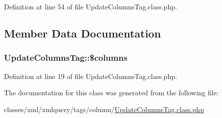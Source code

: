 Definition at line 54 of file Update\-Columns\-Tag.\-class.\-php.



\subsection{Member Data Documentation}
\hypertarget{classUpdateColumnsTag_aa406bc3dae4ef8fde8679bc97a6141b6}{
\subsubsection[{\$columns}]{\setlength{\rightskip}{0pt plus 5cm}Update\-Columns\-Tag\-::\$columns}}\label{classUpdateColumnsTag_aa406bc3dae4ef8fde8679bc97a6141b6}


Definition at line 19 of file Update\-Columns\-Tag.\-class.\-php.



The documentation for this class was generated from the following file\-:\begin{DoxyCompactItemize}
\item 
classes/xml/xmlquery/tags/column/\hyperlink{UpdateColumnsTag_8class_8php}{Update\-Columns\-Tag.\-class.\-php}\end{DoxyCompactItemize}
